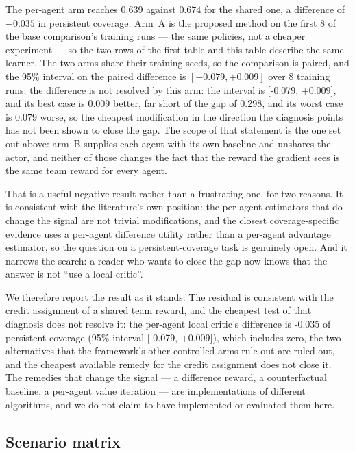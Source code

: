 \documentclass[conference]{IEEEtran}
\begin{document}
The per-agent arm reaches $0.639$ against $0.674$ for
the shared one, a difference of $-0.035$ in persistent coverage.
Arm~A is the proposed method on the first 8 of the base
comparison's training runs --- the same policies, not a cheaper experiment
--- so the two rows of the first table and this table describe the same
learner.
The two arms share their training seeds, so the comparison is paired, and
the 95\% interval on the paired difference is $[-0.079, +0.009]$ over
8 training runs: the difference is not resolved by this arm: the interval is [-0.079, +0.009], and its best case is 0.009 better, far short of the gap of 0.298, and its worst case is 0.079 worse, so the cheapest modification in the direction the diagnosis points has not been shown to close the gap.  The scope of that
statement is the one set out above: arm~B
supplies each agent with its own baseline and unshares the actor, and
neither of those changes the fact that the reward the gradient sees is the
same team reward for every agent.

That is a useful negative result rather than a frustrating one, for two
reasons.  It is consistent with the literature's own position: the
per-agent estimators that do change the signal are not trivial
modifications, and the closest coverage-specific evidence
\cite{sun2023} uses a per-agent difference utility rather than a per-agent
advantage estimator, so the question on a persistent-coverage task is
genuinely open.  And it narrows the search: a reader who wants to close
the gap now knows that the answer is not ``use a local critic''.

We therefore report the result as it stands: The residual is consistent with the credit assignment of a shared team reward, and the cheapest test of that diagnosis does not resolve it: the per-agent local critic's difference is -0.035 of persistent coverage (95\% interval [-0.079, +0.009]), which includes zero, the two
alternatives that the framework's other controlled arms rule out are ruled
out, and the cheapest available remedy for the credit assignment does not
close it.  The remedies that change the
signal --- a difference reward, a counterfactual baseline, a per-agent
value iteration --- are implementations of different algorithms, and we do
not claim to have implemented or evaluated them here.

\subsection{Scenario matrix}
\label{sec:results_scen}
\end{document}
